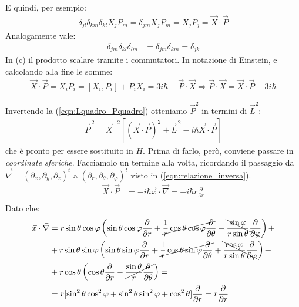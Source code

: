 \documentclass[../../FisicaTeorica.tex]{subfiles}
\begin{document}
E quindi, per esempio:
\begin{align*}
\delta_{jl}\delta_{km}\delta_{kl} X_j P_m =\delta_{jm}X_jP_m =X_j P_j =\vec{X}\cdot \vec{P}
\end{align*}
Analogamente vale:
\begin{align*}
\delta_{jm}\delta_{kl}\delta_{lm}&=\delta_{jm}\delta_{km} = \delta_{jk}
\end{align*}
In (c)  il prodotto scalare tramite i commutatori. In notazione di Einstein, e calcolando alla fine le somme:
\begin{align*}
\vec{X}\cdot \vec{P} = X_i P_i = [X_i, P_i] + P_i X_i = 3i\hbar + \vec{P}\cdot \vec{X} \Rightarrow  \vec{P}\cdot \vec{X} = \vec{X}\cdot\vec{P} - 3i\hbar
\end{align*}

Invertendo la (\ref{eqn:Lquadro_Pquadro}) otteniamo $\vec{P}^2$ in termini di $\vec{L}^2$:
\begin{align}
\vec{P}^{\,2} =\vec{X}^{-2} [(\vec{X}\cdot \vec{P})^2+\vec{L}^{\,2}-i\hbar \vec{X}\cdot\vec{P}]
\label{eqn:Pquadro_Lquadro}
\end{align}
che è pronto per essere sostituito in $H$. Prima di farlo, però, conviene passare in \textit{coordinate sferiche}. Facciamolo un termine alla volta, ricordando il passaggio da $\vec{\nabla}=(\partial_x, \partial_y, \partial_z)^t$ a $(\partial_r, \partial_\theta, \partial_\varphi)^t$ visto in (\ref{eqn:relazione_inversa}).
\begin{align*}
\vec{X}\cdot \vec{P} &= -i\hbar \vec{x}\cdot \vec{\nabla} = -i\hbar r \frac{\partial}{\partial r}\\
\end{align*}
Dato che:
\begin{align*}
\vec{x}\cdot\vec{\nabla} &= r\sin\theta\cos\varphi \left(\sin\theta\cos\varphi \frac{\partial}{\partial r} + \cancel{\frac{1}{r}\cos\theta\cos\varphi\frac{\partial}{\partial \theta}} - \bcancel{\frac{\sin\varphi}{r\sin\theta}\frac{\partial}{\partial \varphi}}\right)+\\
&+r\sin\theta\sin\varphi \left(\sin\theta\sin\varphi \frac{\partial}{\partial r} + \cancel{\frac{1}{r}\cos\theta\sin\varphi\frac{\partial}{\partial \theta}} + \bcancel{\frac{\cos\varphi}{r\sin\theta}\frac{\partial}{\partial \varphi}}\right)+\\
&+r\cos\theta \left(\cos\theta \frac{\partial}{\partial r} -\cancel{\frac{\sin\theta}{r}\frac{\partial}{\partial \theta}}\right) =\\
&=r[\sin^2\theta\cos^2\varphi + \sin^2\theta\sin^2\varphi + \cos^2\theta] \frac{\partial}{\partial r} = r\frac{\partial}{\partial r}
\end{align*}
\end{document}
